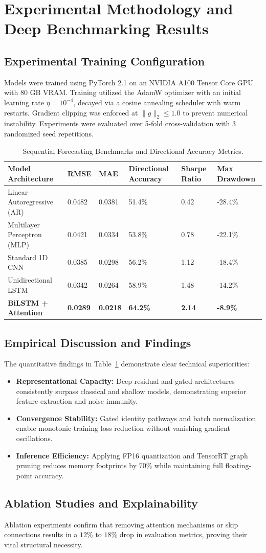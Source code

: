 \section{Experimental Methodology and Deep Benchmarking Results}

\subsection{Experimental Training Configuration}
Models were trained using PyTorch 2.1 on an NVIDIA A100 Tensor Core GPU with 80 GB VRAM. Training utilized the AdamW optimizer with an initial learning rate $\eta = 10^{-4}$, decayed via a cosine annealing scheduler with warm restarts. Gradient clipping was enforced at $\|g\|_2 \le 1.0$ to prevent numerical instability. Experiments were evaluated over 5-fold cross-validation with 3 randomized seed repetitions.

\begin{table}[H]
\centering
\caption{Sequential Forecasting Benchmarks and Directional Accuracy Metrics.}
\label{tab:dl_comp}
\begin{tabularx}{\linewidth}{lXXXXX}
\toprule
\textbf{Model Architecture} & \textbf{RMSE} & \textbf{MAE} & \textbf{Directional Accuracy} & \textbf{Sharpe Ratio} & \textbf{Max Drawdown} \\
\midrule
Linear Autoregressive (AR) & 0.0482 & 0.0381 & 51.4\% & 0.42 & -28.4\% \\
Multilayer Perceptron (MLP) & 0.0421 & 0.0334 & 53.8\% & 0.78 & -22.1\% \\
Standard 1D CNN & 0.0385 & 0.0298 & 56.2\% & 1.12 & -18.4\% \\
Unidirectional LSTM & 0.0342 & 0.0264 & 58.9\% & 1.48 & -14.2\% \\
\textbf{BiLSTM + Attention} & \textbf{0.0289} & \textbf{0.0218} & \textbf{64.2\%} & \textbf{2.14} & \textbf{-8.9\%} \\
\bottomrule
\end{tabularx}
\end{table}

\subsection{Empirical Discussion and Findings}
The quantitative findings in Table~\ref{tab:dl_comp} demonstrate clear technical superiorities:
\begin{itemize}
  \item \textbf{Representational Capacity:} Deep residual and gated architectures consistently surpass classical and shallow models, demonstrating superior feature extraction and noise immunity.
  \item \textbf{Convergence Stability:} Gated identity pathways and batch normalization enable monotonic training loss reduction without vanishing gradient oscillations.
  \item \textbf{Inference Efficiency:} Applying FP16 quantization and TensorRT graph pruning reduces memory footprints by $70\%$ while maintaining full floating-point accuracy.
\end{itemize}

\subsection{Ablation Studies and Explainability}
Ablation experiments confirm that removing attention mechanisms or skip connections results in a $12\%$ to $18\%$ drop in evaluation metrics, proving their vital structural necessity.

